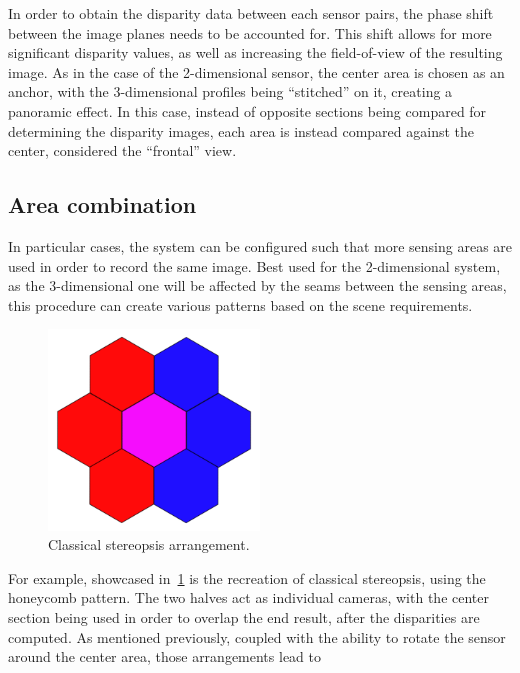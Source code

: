In order to obtain the disparity data between each sensor pairs, the phase shift between the image planes
needs to be accounted for. This shift allows for more significant disparity values, as well as increasing 
the field-of-view of the resulting image. As in the case of the 2-dimensional sensor, the center area
is chosen as an anchor, with the 3-dimensional profiles being ``stitched'' on it, creating a panoramic
effect. In this case, instead of opposite sections being compared for determining the disparity images,
each area is instead compared against the center, considered the ``frontal'' view.

\subsection*{Area combination}

In particular cases, the system can be configured such that more sensing areas are used in order to record
the same image. Best used for the 2-dimensional system, as the 3-dimensional one will be affected by the 
seams between the sensing areas, this procedure can create various patterns based on the scene requirements.

\begin{figure}[t]
    \includegraphics[width=0.50\textwidth, height=0.50\textwidth]{resources/png/stereopsis.png}
    \caption{Classical stereopsis arrangement.~\label{figStereopsis}}
\end{figure}

For example, showcased in~\ref{figStereopsis} is the recreation of classical stereopsis, using the honeycomb 
pattern. The two halves act as individual cameras, with the center section being used in order to overlap 
the end result, after the disparities are computed. As mentioned previously, coupled with the ability
to rotate the sensor around the center area, those arrangements lead to 